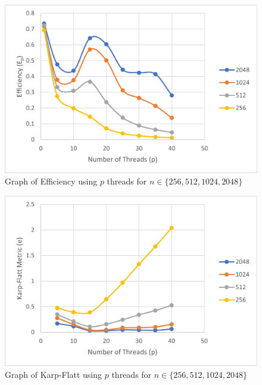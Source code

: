 \begin{figure}[H]
    \centering
    \includegraphics{Epscale}
    \caption{Graph of Efficiency using $p$ threads for $n\in\{256, 512, 1024, 2048\}$}
    \label{fig:Epscale}
\end{figure}

\begin{figure}[H]
    \centering
    \includegraphics{kfscale}
    \caption{Graph of Karp-Flatt using $p$ threads for $n\in\{256, 512, 1024, 2048\}$}
    \label{fig:kfscale}
\end{figure}